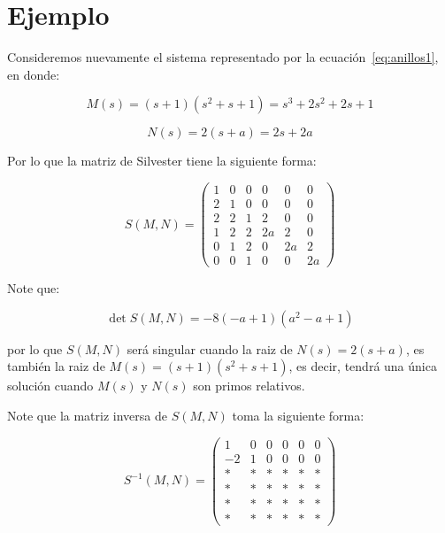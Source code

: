 
    \newpage
    \section{Ejemplo}

        Consideremos nuevamente el sistema representado por la ecuación~\ref{eq:anillos1}, en donde:

        \begin{equation*}
            M(s) = (s+1)(s^2 + s + 1) = s^3 + 2 s^2 + 2 s +1
        \end{equation*}

        \begin{equation*}
            N(s) = 2(s+a) = 2s  + 2a
        \end{equation*}

        Por lo que la matriz de Silvester tiene la siguiente forma:

        \begin{equation*}
            S(M,N) =
            \begin{pmatrix}
                1 & 0 & 0 & 0 & 0 & 0 \\
                2 & 1 & 0 & 0 & 0 & 0 \\
                2 & 2 & 1 & 2 & 0 & 0 \\
                1 & 2 & 2 & 2a & 2 & 0 \\
                0 & 1 & 2 & 0 & 2a & 2 \\
                0 & 0 & 1 & 0 & 0 & 2a
            \end{pmatrix}
        \end{equation*}

        Note que:

        \begin{equation*}
            \det{S(M, N)} = -8 (-a + 1) (a^2 -a +1)
        \end{equation*}

        por lo que $S(M, N)$ será singular cuando la raiz de $N(s) = 2 (s + a)$, es también la raiz de $M(s) = (s + 1)(s^2 + s + 1)$, es decir, tendrá una única solución cuando $M(s)$ y $N(s)$ son primos relativos.

        Note que la matriz inversa de $S(M, N)$ toma la siguiente forma:

        \begin{equation*}
            S^{-1}(M, N) =
            \begin{pmatrix}
                1 & 0 & 0 & 0 & 0 & 0 \\
                -2 & 1 & 0 & 0 & 0 & 0 \\
                * & * & * & * & * & * \\
                * & * & * & * & * & * \\
                * & * & * & * & * & * \\
                * & * & * & * & * & *
            \end{pmatrix}
        \end{equation*}

